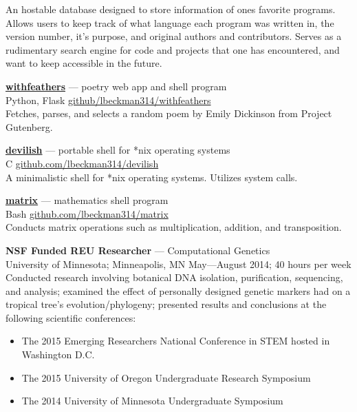 \documentclass[a4paper]{article}
\begin{document}
An hostable database designed to store information of ones favorite programs. Allows users to keep track of what language each program was written in, the version number, it’s purpose, and original authors and contributors. Serves as a rudimentary search engine for code and projects that one has encountered, and want to keep accessible in the future.


\textcolor{my-grey}{\dotfill}
\medbreak

\textcolor{my-blue}{\textbf{\href{https://withfeathers.liambeckman.com}{withfeathers}}} --- poetry web app and shell program\\
\textcolor{my-grey}{Python, Flask \hfill \href{https://github.com/lbeckman314/withfeathers}{github/lbeckman314/withfeathers}}\\

Fetches, parses, and selects a random poem by Emily Dickinson from Project Gutenberg.

\textcolor{my-grey}{\dotfill}
\medbreak

\textcolor{my-blue}{\textbf{\href{https://liambeckman.com/code/devilish}{devilish}}} --- portable shell for *nix operating systems\\
\textcolor{my-grey}{C \hfill \href{https://github.com/lbeckman314/devilsh}{github.com/lbeckman314/devilish}}\\

A minimalistic shell for *nix operating systems. Utilizes system calls.

\textcolor{my-grey}{\dotfill}
\medbreak

\textcolor{my-blue}{\textbf{\href{https://liambeckman.com/code/matrix}{matrix}}} --- mathematics shell program\\
\textcolor{my-grey}{Bash \hfill \href{https://github.com/lbeckman314/matrix}{github.com/lbeckman314/matrix}}\\

Conducts matrix operations such as multiplication, addition, and transposition.

\textcolor{my-grey}{\dotfill}
\medbreak

\textbf{NSF Funded REU Researcher} --- Computational Genetics\\
\textcolor{my-grey}{University of Minnesota; Minneapolis, MN \hfill  May—August 2014; 40 hours per week}\\
Conducted research involving botanical DNA isolation, purification, sequencing, and analysis; examined the effect of personally designed genetic markers had on a tropical tree's evolution/phylogeny; presented results and conclusions at the following scientific conferences:\\
\begin{itemize}
\item The 2015 Emerging Researchers National Conference in STEM hosted in Washington D.C.
\item The 2015 University of Oregon Undergraduate Research Symposium
\item The 2014 University of Minnesota Undergraduate Symposium
\end{itemize}
\end{document}
